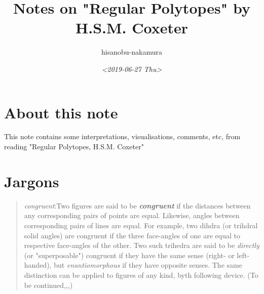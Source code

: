 \documentclass{article}
\author{hisanobu-nakamura}
\date{\textit{<2019-06-27 Thu>}}
\title{Notes on "Regular Polytopes" by H.S.M. Coxeter}
\begin{document}
\maketitle
\tableofcontents




\section{About this note}
\label{sec:orgb23bccb}
This note contains some interpretations, visualisations, comments, etc, from reading "Regular Polytopes, H.S.M. Coxeter"
\section{Jargons}
\label{sec:orgfe4309a}
\begin{quote}
\emph{congruent}:Two figures are said to be \textbf{\emph{congruent}} if the distances between any corresponding pairs of points are equal. Likewise, angles between corresponding pairs of lines are equal. 
For example, two dihdra (or trihdral solid angles) are congruent if the three face-angles of one are equal to respective face-angles of the other. 
Two such trihedra are said to be \emph{directly} (or "superposable") congruent if they have the same sense (right- or left-handed), but \emph{enantiomorphous} if they have opposite senses. 
The same distinction can be applied to figures of any kind, byth following device. (To be continued,,,)
\end{quote}
\end{document}
